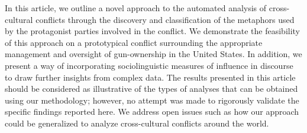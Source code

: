 In this article, we outline a novel approach to the automated analysis of cross-cultural conflicts through the discovery and classification of the metaphors used by the protagonist parties involved in the conflict. We demonstrate the feasibility of this approach on a prototypical conflict surrounding the appropriate management and oversight of gun-ownership in the United States. In addition, we present a way of incorporating sociolinguistic measures of influence in discourse to draw further insights from complex data. The results presented in this article should be considered as illustrative of the types of analyses that can be obtained using our methodology; however, no attempt was made to rigorously validate the specific findings reported here. We address open issues such as how our approach could be generalized to analyze cross-cultural conflicts around the world.
